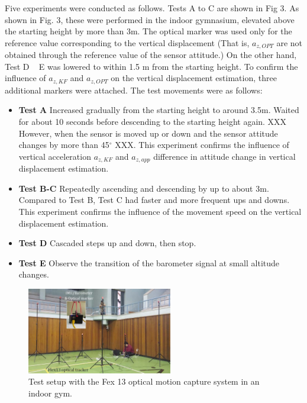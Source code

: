 \documentclass[10pt,journal,compsoc]{IEEEtran}
\begin{document}
Five experiments were conducted as follows. Tests A to C are shown in Fig 3. As
shown in Fig. 3, these were performed in the indoor gymnasium, elevated above the
starting height by more than 3m. The optical marker was used only for the
reference value corresponding to the vertical displacement (That is, $a_{z,OPT}$
are not obtained through the reference value of the sensor attitude.) On the
other hand, Test D ~ E was lowered to within 1.5 m from the starting height.
To confirm the influence of $a_{z,KF}$ and $a_{z,OPT}$ on the vertical displacement
estimation, three additional markers were attached.  The test movements were as follows:
\begin{itemize}
    \item \textbf{Test A} Increased gradually from the starting height to around 3.5m.
         Waited for about 10 seconds before descending to the starting height again.
         XXX However, when the sensor is moved up or down and the sensor attitude changes by more than 
         45$^\circ$ XXX.  This experiment confirms the influence of vertical
         acceleration $a_{z,KF}$ and $a_{z,app}$ difference in attitude change in
         vertical displacement estimation.
    \item \textbf{Test B-C} Repeatedly ascending and descending by up to about 3m. Compared to Test B, 
        Test C had faster and more frequent ups and downs. This experiment
        confirms the influence of the movement speed on the vertical displacement
        estimation.
    \item \textbf{Test D} Cascaded steps up and down, then stop.
    \item \textbf{Test E} Observe the transition of the barometer signal at small altitude changes.
\end{itemize}

\begin{figure}[!t]
\centering
\includegraphics[width=2.5in]{fig3}
\caption{Test setup with the Fex 13 optical motion capture system in an indoor gym.}
\label{fig3}
\end{figure}
\end{document}
